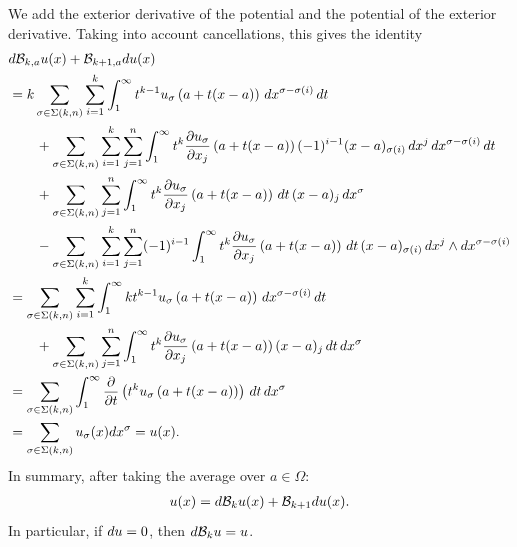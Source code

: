 \documentclass[10pt,letterpaper]{article}
\begin{document}
We add the exterior derivative of the potential and the potential of the exterior derivative.
Taking into account cancellations, this gives the identity 
\begin{align*}
    &
    d {\mathcal B}_{k,a} u(x)
    +
    {\mathcal B}_{k+1,a} d u(x)
    \\&
    =
    k
    \sum_{\sigma \in \Sigma(k,n)} \sum_{i=1}^{k}
    \int_{1}^\infty 
    t^{k-1} u_{\sigma}\left(a+t(x-a)\right) \,dx^{\sigma-\sigma(i)} \,dt 
    \\&\qquad
    + 
    \sum_{\sigma \in \Sigma(k,n)} \sum_{i=1}^{k} \sum_{j=1}^{n}
    \int_{1}^\infty 
    t^{k} \frac{ \partial u_{\sigma} }{\partial x_{j}}\left(a+t(x-a)\right) (-1)^{i-1} (x-a)_{\sigma(i) } \,dx^{j} \,dx^{\sigma-\sigma(i)} \,dt 
    \\&\qquad
    +
    \sum_{\sigma \in \Sigma(k,n)} \sum_{j=1}^{n}
    \int_{1}^\infty t^{k} \frac{ \partial u_{\sigma} }{\partial x_{j}}\left(a+t(x-a)\right) \,dt \,(x-a)_{j} \,dx^{\sigma}
    \\&\qquad
    - 
    \sum_{\sigma \in \Sigma(k,n)} \sum_{i=1}^{k} \sum_{j=1}^{n}
    (-1)^{i-1}
    \int_{1}^\infty t^{k} \frac{ \partial u_{\sigma} }{\partial x_{j}}\left(a+t(x-a)\right) \,dt 
    \,(x-a)_{\sigma(i)} \,dx^{j} \wedge dx^{\sigma-\sigma(i)}
    \\&
    =
    \sum_{\sigma \in \Sigma(k,n)} \sum_{i=1}^{k}
    \int_{1}^\infty 
    k t^{k-1} u_{\sigma}\left(a+t(x-a)\right) \,dx^{\sigma-\sigma(i)} \,dt 
    \\&\qquad
    +
    \sum_{\sigma \in \Sigma(k,n)} \sum_{j=1}^{n}
    \int_{1}^\infty t^{k} \frac{ \partial u_{\sigma} }{\partial x_{j}}\left(a+t(x-a)\right) (x-a)_{j} \,dt \,dx^{\sigma}
    \\&
    =
    \sum_{\sigma \in \Sigma(k,n)} 
    \int_{1}^\infty \frac{\partial}{\partial t} \left( t^{k} u_{\sigma}\left(a+t(x-a)\right) \right) \,dt \,dx^{\sigma}
    \\&
    =
    \sum_{\sigma \in \Sigma(k,n)} 
    u_{\sigma}(x) dx^{\sigma}
    =
    u(x)
    .
\end{align*}
In summary, after taking the average over $a \in \Omega$:
\begin{align*}
    u(x) = d {\mathcal B}_{k} u(x) + {\mathcal B}_{k+1} d u(x)
    .
\end{align*}
In particular, if $d u = 0$, then $d {\mathcal B}_{k} u = u$.
\\
\end{document}
